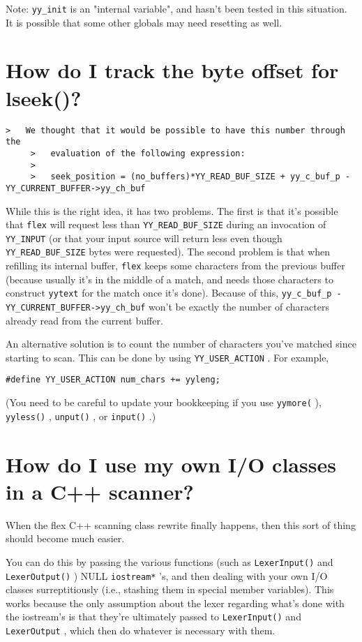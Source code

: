 \documentclass[openany,oneside]{book}
\begin{document}
Note: \verb`yy_init` is an "internal variable", and hasn't been tested in this
situation. It is possible that some other globals may need resetting as well.
\section{How do I track the byte offset for lseek()?}

\begin{verbatim}
>   We thought that it would be possible to have this number through the
     >   evaluation of the following expression:
     >
     >   seek_position = (no_buffers)*YY_READ_BUF_SIZE + yy_c_buf_p - YY_CURRENT_BUFFER->yy_ch_buf
\end{verbatim}


While this is the right idea, it has two problems.  The first is that
it's possible that \verb`flex` will request less than \verb`YY_READ_BUF_SIZE` during
an invocation of \verb`YY_INPUT` (or that your input source will return less
even though \verb`YY_READ_BUF_SIZE` bytes were requested).  The second problem
is that when refilling its internal buffer, \verb`flex` keeps some characters
from the previous buffer (because usually it's in the middle of a match,
and needs those characters to construct \verb`yytext` for the match once it's
done).  Because of this, \verb`yy_c_buf_p - YY_CURRENT_BUFFER->yy_ch_buf` won't
be exactly the number of characters already read from the current buffer.

An alternative solution is to count the number of characters you've matched
since starting to scan.  This can be done by using \verb`YY_USER_ACTION` .  For
example,
\begin{verbatim}
#define YY_USER_ACTION num_chars += yyleng;
\end{verbatim}


(You need to be careful to update your bookkeeping if you use \verb`yymore(` ), \verb`yyless()` , \verb`unput()` , or \verb`input()` .)
\section{How do I use my own I/O classes in a C++ scanner?}


When the flex C++ scanning class rewrite finally happens, then this sort of thing should become much easier.

You can do this by passing the various functions (such as \verb`LexerInput()` and \verb`LexerOutput()` ) NULL \verb`iostream*` 's, and then
dealing with your own I/O classes surreptitiously (i.e., stashing them in
special member variables).  This works because the only assumption about
the lexer regarding what's done with the iostream's is that they're
ultimately passed to \verb`LexerInput()` and \verb`LexerOutput` , which then do whatever
is necessary with them.
\end{document}
